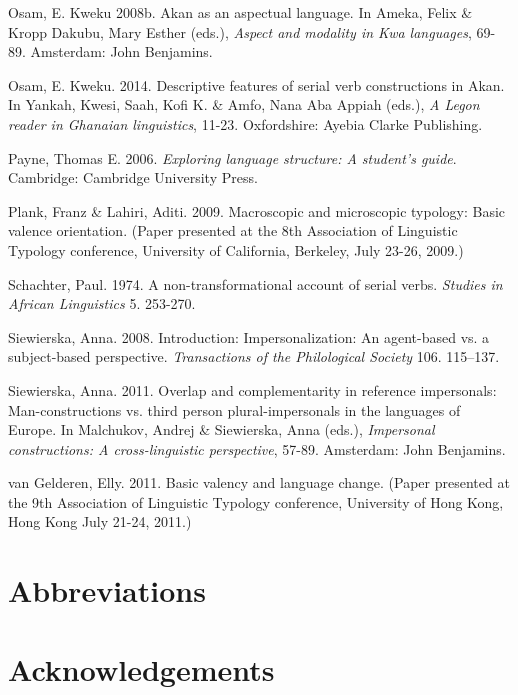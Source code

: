 \documentclass[output=paper]{langsci/langscibook}
\begin{document}
Osam, E. Kweku 2008b. Akan as an aspectual language. In Ameka, Felix \& Kropp Dakubu, Mary Esther (eds.), \textit{Aspect and modality in Kwa languages}, 69-89. Amsterdam: John Benjamins.

Osam, E. Kweku. 2014. Descriptive features of serial verb constructions in Akan. In Yankah, Kwesi, Saah, Kofi K. \& Amfo, Nana Aba Appiah (eds.), \textit{A Legon reader in Ghanaian linguistics}, 11-23. Oxfordshire: Ayebia Clarke Publishing.

Payne, Thomas E. 2006. \textit{Exploring language structure: A student’s guide}. Cambridge: Cambridge University Press.

Plank, Franz \& Lahiri, Aditi. 2009. Macroscopic and microscopic typology: Basic valence orientation. (Paper presented at the 8th Association of Linguistic Typology conference, University of California, Berkeley, July 23-26, 2009.)

Schachter, Paul. 1974. A non-transformational account of serial verbs. \textit{Studies in African Linguistics} 5. 253-270.

Siewierska, Anna. 2008. Introduction: Impersonalization: An agent-based vs. a subject-based perspective. \textit{Transactions of the Philological Society} 106. 115–137.

Siewierska, Anna. 2011. Overlap and complementarity in reference impersonals: Man-constructions vs. third person plural-impersonals in the languages of Europe. In Malchukov, Andrej \& Siewierska, Anna (eds.), \textit{Impersonal constructions: A cross-linguistic perspective}, 57-89. Amsterdam: John Benjamins.

van Gelderen, Elly. 2011. Basic valency and language change. (Paper presented at the 9th Association of Linguistic Typology conference, University of Hong Kong, Hong Kong July 21-24, 2011.)


\section*{Abbreviations}
\section*{Acknowledgements}

{\sloppy
\printbibliography[heading=subbibliography,notkeyword=this]
}
\end{document}
